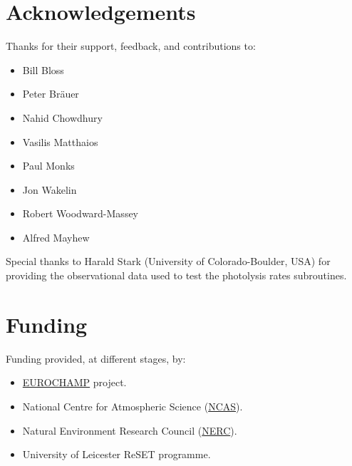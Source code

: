 \section{Acknowledgements} \label{sec:acknowledgements}

Thanks for their support, feedback, and contributions to:

\begin{itemize}
\item Bill Bloss
\item Peter Br{\"a}uer
\item Nahid Chowdhury
\item Vasilis Matthaios
\item Paul Monks
\item Jon Wakelin
\item Robert Woodward-Massey
\item Alfred Mayhew
\end{itemize}

Special thanks to Harald Stark (University of Colorado-Boulder, USA)
for providing the observational data used to test the photolysis rates
subroutines.

\section{Funding} \label{sec:funding}

Funding provided, at different stages, by:

\begin{itemize}
\item \href{https://www.eurochamp.org/}{EUROCHAMP} project.
\item National Centre for Atmospheric Science
  (\href{https://www.ncas.ac.uk/}{NCAS}).
\item Natural Environment Research Council
  (\href{https://nerc.ukri.org/}{NERC}).
\item University of Leicester ReSET programme.
\end{itemize}
